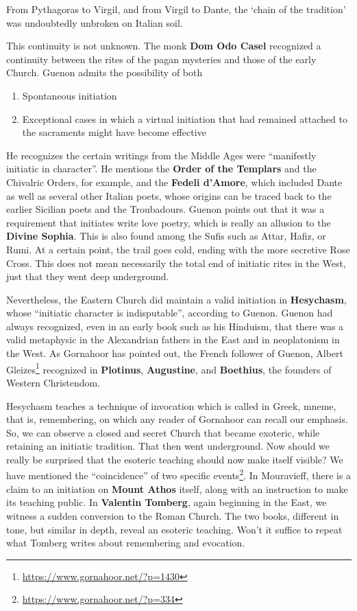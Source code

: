\begin{quotex}
From Pythagoras to Virgil, and from Virgil to Dante, the `chain of the tradition' was undoubtedly unbroken on Italian soil. 

\end{quotex}
This continuity is not unknown. The monk \textbf{Dom Odo Casel} recognized a continuity between the rites of the pagan mysteries and those of the early Church. Guenon admits the possibility of both

\begin{enumerate}
\item Spontaneous initiation 
\item Exceptional cases in which a virtual initiation that had remained attached to the sacraments might have become effective 
\end{enumerate}

He recognizes the certain writings from the Middle Ages were “manifestly initiatic in character”. He mentions the \textbf{Order of the Templars} and the Chivalric Orders, for example, and the \textbf{Fedeli d'Amore}, which included Dante as well as several other Italian poets, whose origins can be traced back to the earlier Sicilian poets and the Troubadours. Guenon points out that it was a requirement that initiates write love poetry, which is really an allusion to the \textbf{Divine Sophia}. This is also found among the Sufis such as Attar, Hafiz, or Rumi. At a certain point, the trail goes cold, ending with the more secretive Rose Cross. This does not mean necessarily the total end of initiatic rites in the West, just that they went deep underground.

Nevertheless, the Eastern Church did maintain a valid initiation in \textbf{Hesychasm}, whose “initiatic character is indisputable”, according to Guenon. Guenon had always recognized, even in an early book such as his Hinduism, that there was a valid metaphysic in the Alexandrian fathers in the East and in neoplatonism in the West. As Gornahoor has pointed out, the French follower of Guenon, Albert Gleizes\footnote{\url{https://www.gornahoor.net/?p=1430}} recognized in \textbf{Plotinus}, \textbf{Augustine}, and \textbf{Boethius}, the founders of Western Christendom.

Hesychasm teaches a technique of invocation which is called in Greek, mneme, that is, remembering, on which any reader of Gornahoor can recall our emphasis. So, we can observe a closed and secret Church that became exoteric, while retaining an initiatic tradition. That then went underground. Now should we really be surprised that the esoteric teaching should now make itself visible? We have mentioned the “coincidence” of two specific events\footnote{\url{https://www.gornahoor.net/?p=334}}. In Mouravieff, there is a claim to an initiation on \textbf{Mount Athos} itself, along with an instruction to make its teaching public. In \textbf{Valentin Tomberg}, again beginning in the East, we witness a sudden conversion to the Roman Church. The two books, different in tone, but similar in depth, reveal an esoteric teaching. Won't it suffice to repeat what Tomberg writes about remembering and evocation.

